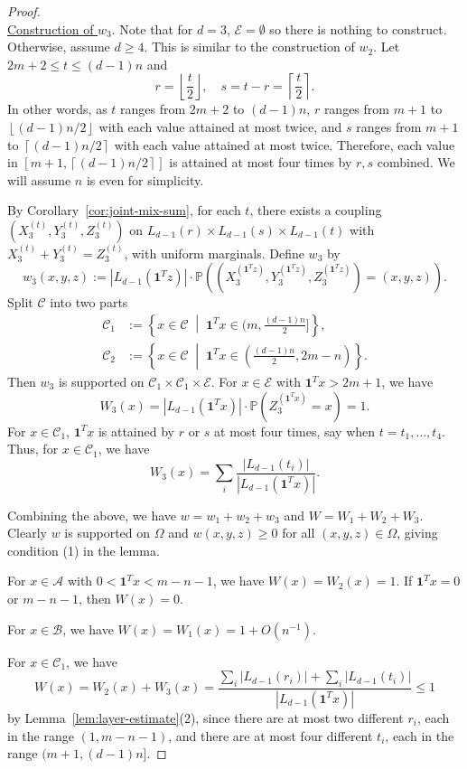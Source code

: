 \documentclass{article}
\newcommand{\floor}[1]{\left\lfloor #1 \right\rfloor}
\newcommand{\ceil}[1]{\left\lceil #1 \right\rceil}
\newcommand{\setcond}[2]{\left\{ #1 \;\middle\vert\; #2 \right\}}
\newcommand{\PP}{\mathbb{P}}
\newcommand{\cA}{\mathcal{A}}
\newcommand{\cB}{\mathcal{B}}
\newcommand{\cC}{\mathcal{C}}
\newcommand{\cE}{\mathcal{E}}
\newcommand{\ones}{\mathbf{1}}
\theoremstyle{definition}
\begin{document}
\begin{proof}
    \noindent\\
    \underline{Construction of $w_3$}. Note that for $d=3$, $\cE=\emptyset$ so there is nothing to construct. Otherwise, assume $d\geq 4$. This is similar to the construction of $w_2$. Let $2m+2\leq t\leq (d-1)n$ and
    \[r=\floor{\frac{t}{2}},\quad s=t-r=\ceil{\frac{t}{2}}.\]
    In other words, as $t$ ranges from $2m+2$ to $(d-1)n$, $r$ ranges from $m+1$ to $\floor{(d-1)n/2}$ with each value attained at most twice, and $s$ ranges from $m+1$ to $\ceil{(d-1)n/2}$ with each value attained at most twice. Therefore, each value in $[m+1,\ceil{(d-1)n/2}]$ is attained at most four times by $r,s$ combined. We will assume $n$ is even for simplicity.

    By Corollary~\ref{cor:joint-mix-sum}, for each $t$, there exists a coupling $(X_3^{(t)},Y_3^{(t)},Z_3^{(t)})$ on $L_{d-1}(r)\times L_{d-1}(s)\times L_{d-1}(t)$ with $X_3^{(t)}+Y_3^{(t)}=Z_3^{(t)}$, with uniform marginals. Define $w_3$ by
    \[w_3(x,y,z) := |L_{d-1}(\ones^T z)|\cdot \PP((X_3^{(\ones^T z)},Y_3^{(\ones^T z)},Z_3^{(\ones^T z)})=(x,y,z)).\]
    Split $\cC$ into two parts
    \begin{align*}
        \cC_1 & := \setcond{x\in \cC}{\ones^T x \in (m,\tfrac{(d-1)n}{2}]}, \\
        \cC_2 & := \setcond{x\in \cC}{\ones^T x \in (\tfrac{(d-1)n}{2},2m-n)}.
    \end{align*}
    Then $w_3$ is supported on $\cC_1\times \cC_1\times \cE$. For $x\in \cE$ with $\ones^T x > 2m+1$, we have
    \[W_3(x) = |L_{d-1}(\ones^T x)| \cdot \PP(Z_3^{(\ones^T x)}=x) = 1.\]
    For $x\in \cC_1$, $\ones^T x$ is attained by $r$ or $s$ at most four times, say when $t=t_1,\ldots,t_4$. Thus, for $x\in \cC_1$, we have
    \[W_3(x) = \sum_i \frac{|L_{d-1}(t_i)|}{|L_{d-1}(\ones^T x)|}.\]

    Combining the above, we have $w=w_1+w_2+w_3$ and $W=W_1+W_2+W_3$. Clearly $w$ is supported on $\Omega$ and $w(x,y,z)\geq 0$ for all $(x,y,z)\in \Omega$, giving condition (1) in the lemma.

    For $x\in \cA$ with $0<\ones^T x < m-n-1$, we have $W(x) = W_2(x) = 1$. If $\ones^T x = 0$ or $m-n-1$, then $W(x)=0$. 
    
    For $x\in \cB$, we have $W(x) = W_1(x) = 1+O(n^{-1})$. 
    
    For $x\in \cC_1$, we have
    \[W(x) = W_2(x)+W_3(x) = \frac{\sum_i |L_{d-1}(r_i)|+\sum_i |L_{d-1}(t_i)|}{|L_{d-1}(\ones^T x)|}\leq 1\]
    by Lemma~\ref{lem:layer-estimate}(2), since there are at most two different $r_i$, each in the range $(1,m-n-1)$, and there are at most four different $t_i$, each in the range $(m+1,(d-1)n]$.


\end{proof}
\end{document}

